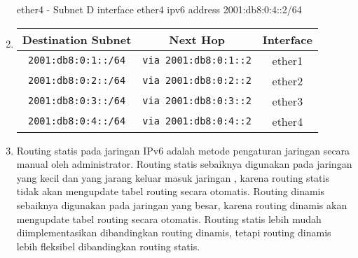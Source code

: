 \begin{enumerate}
	ether4 - Subnet D
	interface ether4
	ipv6 address 2001:db8:0:4::2/64
	\item
    \begin{center}
    \begin{tabular}{|c|c|c|}
    \hline
    \textbf{Destination Subnet} & \textbf{Next Hop} & \textbf{Interface}  \\
    \hline
	\texttt{2001:db8:0:1::/64} & \texttt{via 2001:db8:0:1::2} & ether1 \\
	\texttt{2001:db8:0:2::/64} & \texttt{via 2001:db8:0:2::2} & ether2 \\
	\texttt{2001:db8:0:3::/64} & \texttt{via 2001:db8:0:3::2} & ether3 \\
	\texttt{2001:db8:0:4::/64} & \texttt{via 2001:db8:0:4::2} & ether4 \\
    \hline
    \end{tabular}
    \label{tab:routing}
    \end{center}
	\item Routing statis pada jaringan IPv6 adalah metode pengaturan jaringan secara manual oleh administrator.
		Routing statis sebaiknya digunakan pada jaringan yang kecil dan yang jarang keluar masuk jaringan
		, karena routing statis tidak akan mengupdate tabel routing secara otomatis. Routing dinamis sebaiknya digunakan pada jaringan yang besar,
		karena routing dinamis akan mengupdate tabel routing secara otomatis. Routing statis lebih mudah diimplementasikan
		dibandingkan routing dinamis, tetapi routing dinamis lebih fleksibel dibandingkan routing statis.
\end{enumerate}